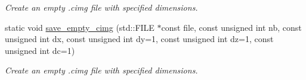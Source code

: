 \begin{DoxyCompactItemize}
\begin{DoxyCompactList}\small\item\em Create an empty .cimg file with specified dimensions. \item\end{DoxyCompactList}\item 
\hypertarget{structcimg__library_1_1CImgList_ae279dbad076425b487bdff7ca0bc6189}{
static void \hyperlink{structcimg__library_1_1CImgList_ae279dbad076425b487bdff7ca0bc6189}{save\_\-empty\_\-cimg} (std::FILE $\ast$const file, const unsigned int nb, const unsigned int dx, const unsigned int dy=1, const unsigned int dz=1, const unsigned int dc=1)}
\label{structcimg__library_1_1CImgList_ae279dbad076425b487bdff7ca0bc6189}

\begin{DoxyCompactList}\small\item\em Create an empty .cimg file with specified dimensions. \item\end{DoxyCompactList}\end{DoxyCompactItemize}

